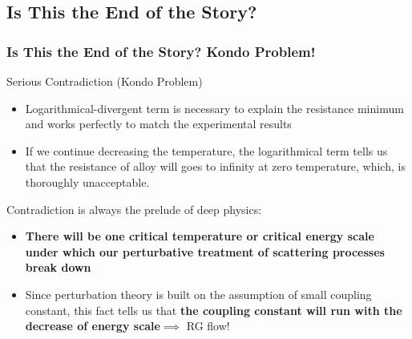 \documentclass[10pt,aspectratio=43,xcolor=x11names]{beamer}%
\begin{document}
	\subsection{Is This the End of the Story?}
		\begin{frame}\frametitle{Is This the End of the Story? Kondo Problem!}
			\begin{redblock}{Serious Contradiction (Kondo Problem)}
				\begin{itemize}
					\item Logarithmical-divergent term is necessary to explain the resistance minimum and works perfectly to match the experimental results
					\item If we continue decreasing the temperature, the logarithmical term tells us that the resistance of alloy will goes to infinity at zero temperature, which, is thoroughly unacceptable.
				\end{itemize}
			\end{redblock}
			\pause
			Contradiction is always the prelude of deep physics:
			\pause
			\begin{itemize}
				\item {\color{blue}\textbf{There will be one critical temperature or critical energy scale under which our perturbative treatment of scattering processes break down}}
				\item Since perturbation theory is built on the assumption of small coupling constant, this fact tells us that {\color{blue}\textbf{the coupling constant will run with the decrease of energy scale}}$\implies$ RG flow!
			\end{itemize}
		\end{frame}
\end{document}
